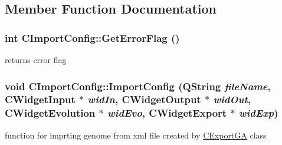 \subsection{Member Function Documentation}
\hypertarget{classCImportConfig_a3a92df143f5a70a40e7c28cbea76b0bd}{
\subsubsection[{GetErrorFlag}]{\setlength{\rightskip}{0pt plus 5cm}int CImportConfig::GetErrorFlag ()}}
\label{classCImportConfig_a3a92df143f5a70a40e7c28cbea76b0bd}
returns error flag \hypertarget{classCImportConfig_af4d96bf6b02540218f0210c196361bb3}{
\subsubsection[{ImportConfig}]{\setlength{\rightskip}{0pt plus 5cm}void CImportConfig::ImportConfig (QString {\em fileName}, \/  {\bf CWidgetInput} $\ast$ {\em widIn}, \/  {\bf CWidgetOutput} $\ast$ {\em widOut}, \/  {\bf CWidgetEvolution} $\ast$ {\em widEvo}, \/  {\bf CWidgetExport} $\ast$ {\em widExp})}}
\label{classCImportConfig_af4d96bf6b02540218f0210c196361bb3}
function for imprting genome from xml file created by \hyperlink{classCExportGA}{CExportGA} class


